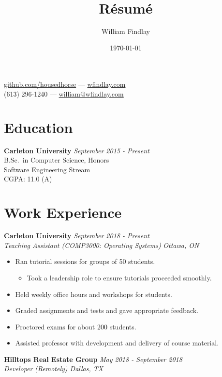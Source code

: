 \documentclass[]{article}
\title{Résumé}
\author{William Findlay}
\date{\today}
\makeatletter
\providecommand{\tightlist}{%
  \setlength{\itemsep}{0pt}\setlength{\parskip}{0pt}}
\renewcommand{\maketitle}{
\begin{center}
{\Huge\bfseries
\theauthor}
\vspace{-.5em}

\href{https://www.github.com/housedhorse}{github.com/housedhorse} --- \href{http://www.wfindlay.com}{wfindlay.com}\\
(613) 296-1240 --- \href{mailto:william@wfindlay.com}{william@wfindlay.com}

\end{center}
}
\makeatother
\begin{document}
\maketitle

\renewcommand{\indent}{\hspace*{0.3in}\ignorespaces}
\setlength{\captionmargin}{1in}
\lstset{mathescape=true,numbers=left,breaklines=true,frame=single,language=C}
\thispagestyle{empty}

\hypertarget{education}{%
\section{Education}\label{education}}

\textbf{Carleton University}
\hfill\hfill \emph{September 2015 - Present}\\
B.Sc.~in Computer Science, Honors\\
Software Engineering Stream\\
CGPA: 11.0 (A)

\hypertarget{work-experience}{%
\section{Work Experience}\label{work-experience}}

\textbf{Carleton University}
\hfill\hfill \emph{September 2018 - Present}\\
\emph{Teaching Assistant (COMP3000: Operating Systems)}
\hfill\hfill \emph{Ottawa, ON}

\begin{itemize}
\tightlist
\item
  Ran tutorial sessions for groups of 50 students.

  \begin{itemize}
  \tightlist
  \item
    Took a leadership role to ensure tutorials proceeded smoothly.
  \end{itemize}
\item
  Held weekly office hours and workshops for students.
\item
  Graded assignments and tests and gave appropriate feedback.
\item
  Proctored exams for about 200 students.
\item
  Assisted professor with development and delivery of course material.
\end{itemize}

\textbf{Hilltops Real Estate Group}
\hfill\hfill \emph{May 2018 - September 2018}\\
\emph{Developer} \hfill\hfill \emph{(Remotely) Dallas, TX}
\end{document}
